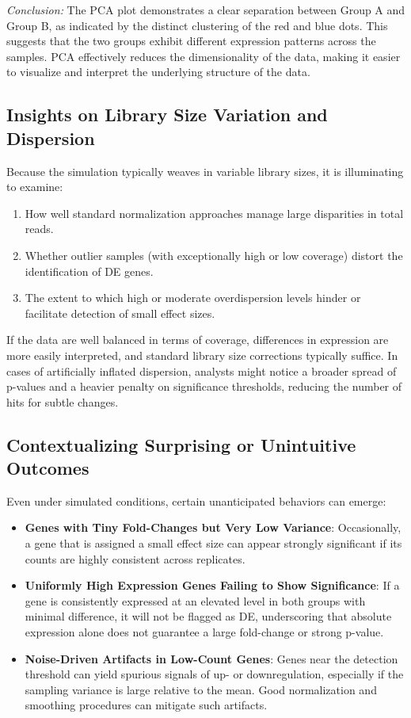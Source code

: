 \documentclass[12pt]{article}
\begin{document}
\textit{Conclusion:} The PCA plot demonstrates a clear separation between Group A and Group B, as indicated by the distinct clustering of the red and blue dots. This suggests that the two groups exhibit different expression patterns across the samples. PCA effectively reduces the dimensionality of the data, making it easier to visualize and interpret the underlying structure of the data.

\subsection{Insights on Library Size Variation and Dispersion}
Because the simulation typically weaves in variable library sizes, it is illuminating to examine:

\begin{enumerate}
    \item How well standard normalization approaches manage large disparities in total reads.
    \item Whether outlier samples (with exceptionally high or low coverage) distort the identification of DE genes.
    \item The extent to which high or moderate overdispersion levels hinder or facilitate detection of small effect sizes.
\end{enumerate}

If the data are well balanced in terms of coverage, differences in expression are more easily interpreted, and standard library size corrections typically suffice. In cases of artificially inflated dispersion, analysts might notice a broader spread of p-values and a heavier penalty on significance thresholds, reducing the number of hits for subtle changes.

\subsection{Contextualizing Surprising or Unintuitive Outcomes}
Even under simulated conditions, certain unanticipated behaviors can emerge:

\begin{itemize}
    \item \textbf{Genes with Tiny Fold-Changes but Very Low Variance}: Occasionally, a gene that is assigned a small effect size can appear strongly significant if its counts are highly consistent across replicates. 
    \item \textbf{Uniformly High Expression Genes Failing to Show Significance}: If a gene is consistently expressed at an elevated level in both groups with minimal difference, it will not be flagged as DE, underscoring that absolute expression alone does not guarantee a large fold-change or strong p-value.
    \item \textbf{Noise-Driven Artifacts in Low-Count Genes}: Genes near the detection threshold can yield spurious signals of up- or downregulation, especially if the sampling variance is large relative to the mean. Good normalization and smoothing procedures can mitigate such artifacts.
\end{itemize}
\end{document}

